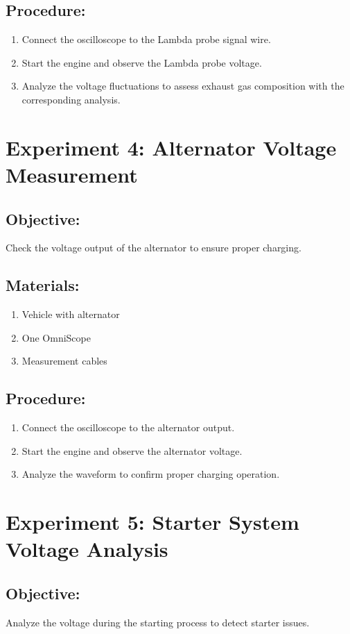 \documentclass[]{scrreprt}
\begin{document}
\subsection*{Procedure:}
\begin{enumerate}
    \item Connect the oscilloscope to the Lambda probe signal wire.
    \item Start the engine and observe the Lambda probe voltage.
    \item Analyze the voltage fluctuations to assess exhaust gas composition with the corresponding analysis.
\end{enumerate}

\section*{Experiment 4: Alternator Voltage Measurement}
\subsection*{Objective:} Check the voltage output of the alternator to ensure proper charging.
\subsection*{Materials:}
\begin{enumerate}
    \item Vehicle with alternator
    \item One OmniScope
    \item Measurement cables
\end{enumerate}
\subsection*{Procedure:}
\begin{enumerate}
    \item Connect the oscilloscope to the alternator output.
    \item Start the engine and observe the alternator voltage.
    \item Analyze the waveform to confirm proper charging operation.
\end{enumerate}

\section*{Experiment 5: Starter System Voltage Analysis}
\subsection*{Objective:} Analyze the voltage during the starting process to detect starter issues.
\end{document}
